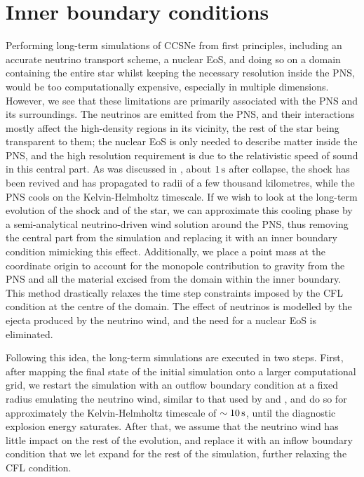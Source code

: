 \section{Inner boundary conditions} \label{sec:bdry_condition}

Performing long-term simulations of CCSNe from first principles, including an accurate neutrino transport scheme, a nuclear EoS, and doing so on a domain containing the entire star whilst keeping the necessary resolution inside the PNS, would be too computationally expensive, especially in multiple dimensions. However, we see that these limitations are primarily associated with the PNS and its surroundings. The neutrinos are emitted from the PNS, and their interactions mostly affect the high-density regions in its vicinity, the rest of the star being transparent to them; the nuclear EoS is only needed to describe matter inside the PNS, and the high resolution requirement is due to the relativistic speed of sound in this central part. As was discussed in , about \(1\,\mathrm{s}\) after collapse, the shock has been revived and has propagated to radii of a few thousand kilometres, while the PNS cools on the Kelvin-Helmholtz timescale. If we wish to look at the long-term evolution of the shock and of the star, we can approximate this cooling phase by a semi-analytical neutrino-driven wind solution around the PNS, thus removing the central part from the simulation and replacing it with an inner boundary condition mimicking this effect. Additionally, we place a point mass at the coordinate origin to account for the monopole contribution to gravity from the PNS and all the material excised from the domain within the inner boundary. This method drastically relaxes the time step constraints imposed by the CFL condition at the centre of the domain. The effect of neutrinos is modelled by the ejecta produced by the neutrino wind, and the need for a nuclear EoS is eliminated.

Following this idea, the long-term simulations are executed in two steps. First, after mapping the final state of the initial simulation onto a larger computational grid, we restart the simulation with an outflow boundary condition at a fixed radius emulating the neutrino wind, similar to that used by \cite{Wongwathanarat2015} and \cite{Stockinger2020}, and do so for approximately the Kelvin-Helmholtz timescale of \(\sim10\,\mathrm{s}\), until the diagnostic explosion energy saturates. After that, we assume that the neutrino wind has little impact on the rest of the evolution, and replace it with an inflow boundary condition that we let expand for the rest of the simulation, further relaxing the CFL condition.

